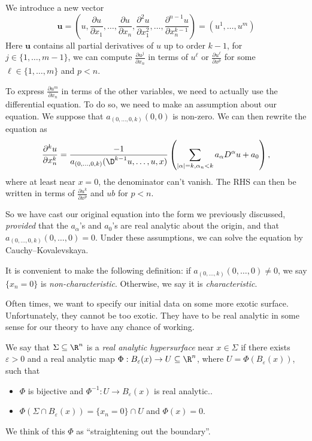\documentclass[a4paper]{article}
\begin{document}
We introduce a new vector
\[
  \mathbf{u} = \left(u, \frac{\partial u}{\partial x_1}, \ldots, \frac{\partial u}{\partial x_n}, \frac{\partial^2 u}{\partial x_1^2}, \ldots, \frac{\partial^{n - 1} u}{\partial x_n^{k - 1}}\right) = (u^1, \ldots, u^m)
\]
Here $\mathbf{u}$ contains all partial derivatives of $u$ up to order $k - 1$, for $j \in \{1, \ldots, m - 1\}$, we can compute $\frac{\partial u^j}{\partial x_n}$ in terms of $u^\ell$ or $\frac{\partial u^\ell}{\partial x^p}$ for some $\ell \in \{1, \ldots, m\}$ and $p < n$.

To express $\frac{\partial u^m}{\partial x_n}$ in terms of the other variables, we need to actually use the differential equation. To do so, we need to make an assumption about our equation. We suppose that $a_{(0, \ldots, 0, k)}(0, 0)$ is non-zero. We can then rewrite the equation as
\[
  \frac{\partial^k u}{\partial x_n^k} = \frac{-1}{a_{(0, \ldots, 0, k)}(\D^{k - 1}u, \ldots, u, x)} \left(\sum_{|\alpha| = k, \alpha_n < k} a_\alpha D^\alpha u + a_0\right),
\]
where at least near $x = 0$, the denominator can't vanish. The RHS can then be written in terms of $\frac{\partial u^k}{\partial x^p}$ and $ub$ for $p < n$.

So we have cast our original equation into the form we previously discussed, \emph{provided} that the $a_\alpha$'s and $a_0$'s are real analytic about the origin, and that $a_{(0, \ldots, 0, k)}(0, \ldots, 0) = 0$. Under these assumptions, we can solve the equation by Cauchy--Kovalevskaya.

It is convenient to make the following definition: if $a_{(0, \ldots, k)} (0, \ldots, 0) \not= 0$, we say $\{x_n = 0\}$ is \emph{non-characteristic}. Otherwise, we say it is \emph{characteristic}.

Often times, we want to specify our initial data on some more exotic surface. Unfortunately, they cannot be too exotic. They have to be real analytic in some sense for our theory to have any chance of working.

\begin{defi}
  We say that $\Sigma \subseteq \R^n$ is a \emph{real analytic hypersurface} near $x \in \Sigma$ if there exists $\varepsilon > 0$ and a real analytic map $\Phi: B_\varepsilon(x) \to U \subseteq \R^n$, where $U = \Phi(B_\varepsilon(x))$, such that
  \begin{itemize}
    \item $\Phi$ is bijective and $\Phi^{-1}: U \to B_\varepsilon(x)$ is real analytic..
    \item $\Phi(\Sigma \cap B_\varepsilon(x)) = \{x_n = 0 \} \cap U$ and $\Phi(x) = 0$.
  \end{itemize}
\end{defi}
We think of this $\Phi$ as ``straightening out the boundary''.
\end{document}
